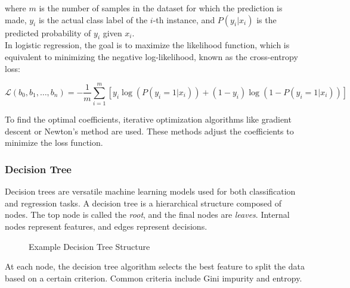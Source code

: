 where \(m\) is the number of samples in the dataset for which the prediction is made, \(y_i\) is the actual class label of the \(i\)-th instance, and \(P(y_i|x_i)\) is the predicted probability of \(y_i\) given \(x_i\).\\


In logistic regression, the goal is to maximize the likelihood function, which is equivalent to minimizing the negative log-likelihood, known as the cross-entropy loss:

\begin{equation*}
    \mathcal{L}(b_0, b_1, \ldots, b_n) = -\frac{1}{m}\sum_{i=1}^{m} \left[y_i\log\left(P(y_i=1|x_i)\right) + (1-y_i)\log\left(1-P(y_i=1|x_i)\right)\right]
\end{equation*}


To find the optimal coefficients, iterative optimization algorithms like gradient descent or Newton's method are used. These methods adjust the coefficients to minimize the loss function.

\subsubsection{Decision Tree}

Decision trees are versatile machine learning models used for both classification and regression tasks. A decision tree is a hierarchical structure composed of nodes. The top node is called the \textit{root}, and the final nodes are \textit{leaves}. Internal nodes represent features, and edges represent decisions.

\begin{figure}[h]
    \centering
    \caption{Example Decision Tree Structure}
\end{figure}


At each node, the decision tree algorithm selects the best feature to split the data based on a certain criterion. Common criteria include Gini impurity and entropy.

